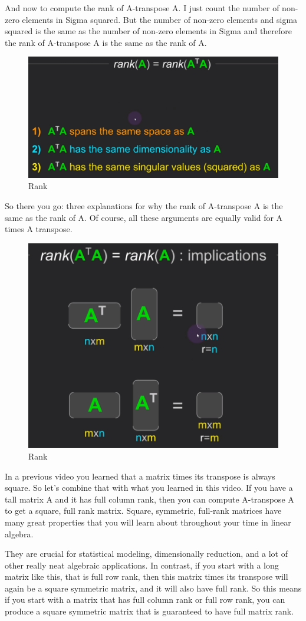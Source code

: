\documentclass[fleqn,10pt]{olplainarticle}
\theoremstyle{definition}
\theoremstyle{remark}
\begin{document}
And now to compute the rank of A-transpose A. I just count the number of non-zero elements in Sigma squared. But the number of non-zero elements and sigma squared is the same as the number of non-zero elements in Sigma and therefore the rank of A-transpose A is the same as the rank of A.

\begin{figure}[ht]
	\centering
	\includegraphics[width=0.5\linewidth]{images/rank-26.png}
	\caption{Rank}
	\label{fig:rank_26}
\end{figure}

So there you go: three explanations for why the rank of A-transpose A is the same as the rank of A. Of course, all these arguments are equally valid for A times A transpose. 

\begin{figure}[ht]
	\centering
	\includegraphics[width=0.5\linewidth]{images/rank-27.png}
	\caption{Rank}
	\label{fig:rank_27}
\end{figure}

In a previous video you learned that a matrix times its transpose is always square. So let's combine that with what you learned in this video. If you have a tall matrix A and it has full column rank, then you can compute A-transpose A to get a square, full rank matrix. Square, symmetric, full-rank matrices have many great properties that you will learn about throughout your time in linear algebra.

They are crucial for statistical modeling, dimensionally reduction, and a lot of other really neat algebraic applications. In contrast, if you start with a long matrix like this, that is full row rank, then this matrix times its transpose will again be a square symmetric matrix, and it will also have full rank. So this means if you start with a matrix that has full column rank or full row rank, you can produce a square symmetric matrix that is guaranteed to have full matrix rank.
\end{document}
